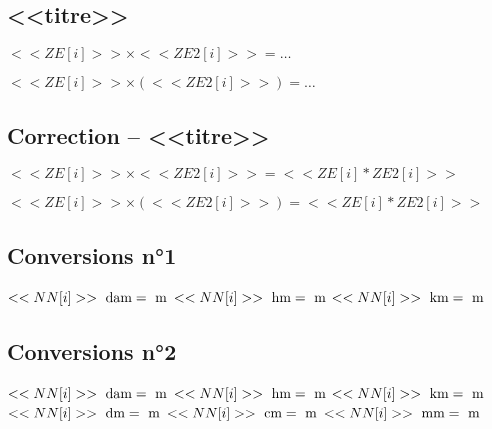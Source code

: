 \documentclass[a4paper,11pt,fleqn]{article}
\begin{document}

\subsection*{<<titre>>}
\begin{description}

  \item $<<ZE[i]>>\times<<ZE2[i]>>=\ldots$
  \item $<<ZE[i]>>\times(<<ZE2[i]>>)=\ldots$	
\end{description}

\subsection{Correction -- <<titre>>}
\begin{description}

  \item $<<ZE[i]>>\times<<ZE2[i]>>=<<ZE[i]*ZE2[i]>>$
  \item $<<ZE[i]>>\times(<<ZE2[i]>>)=<<ZE[i]*ZE2[i]>>$	
\end{description}

\subsection*{Conversions n°1}

\begin{multicols}{4}


$<<NN[i]>>~\text{dam}=\dotfill~\text{m}$
$<<NN[i]>>~\text{hm}=\dotfill~\text{m}$
$<<NN[i]>>~\text{km}=\dotfill~\text{m}$

\end{multicols}

\subsection*{Conversions n°2}

\begin{multicols}{4}


$<<NN[i]>>~\text{dam}=\dotfill~\text{m}$
$<<NN[i]>>~\text{hm}=\dotfill~\text{m}$
$<<NN[i]>>~\text{km}=\dotfill~\text{m}$
$<<NN[i]>>~\text{dm}=\dotfill~\text{m}$
$<<NN[i]>>~\text{cm}=\dotfill~\text{m}$
$<<NN[i]>>~\text{mm}=\dotfill~\text{m}$

	
\end{multicols}
\end{document}
